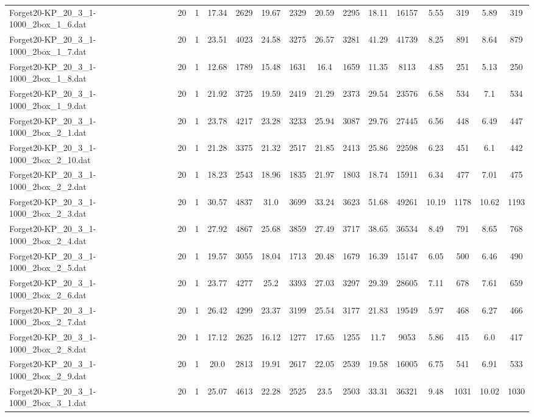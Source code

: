 \begin{table}[!ht]
{\begin{tabular}{lcccccccccccccc}
Forget20-KP\_20\_3\_1-1000\_2box\_1\_6.dat & 20 & 1 & 17.34 & 2629 & 19.67 & 2329 & 20.59 & 2295 & 18.11 & 16157 & 5.55 & 319 & 5.89 & 319 \\
Forget20-KP\_20\_3\_1-1000\_2box\_1\_7.dat & 20 & 1 & 23.51 & 4023 & 24.58 & 3275 & 26.57 & 3281 & 41.29 & 41739 & 8.25 & 891 & 8.64 & 879 \\
Forget20-KP\_20\_3\_1-1000\_2box\_1\_8.dat & 20 & 1 & 12.68 & 1789 & 15.48 & 1631 & 16.4 & 1659 & 11.35 & 8113 & 4.85 & 251 & 5.13 & 250 \\
Forget20-KP\_20\_3\_1-1000\_2box\_1\_9.dat & 20 & 1 & 21.92 & 3725 & 19.59 & 2419 & 21.29 & 2373 & 29.54 & 23576 & 6.58 & 534 & 7.1 & 534 \\
Forget20-KP\_20\_3\_1-1000\_2box\_2\_1.dat & 20 & 1 & 23.78 & 4217 & 23.28 & 3233 & 25.94 & 3087 & 29.76 & 27445 & 6.56 & 448 & 6.49 & 447 \\
Forget20-KP\_20\_3\_1-1000\_2box\_2\_10.dat & 20 & 1 & 21.28 & 3375 & 21.32 & 2517 & 21.85 & 2413 & 25.86 & 22598 & 6.23 & 451 & 6.1 & 442 \\
Forget20-KP\_20\_3\_1-1000\_2box\_2\_2.dat & 20 & 1 & 18.23 & 2543 & 18.96 & 1835 & 21.97 & 1803 & 18.74 & 15911 & 6.34 & 477 & 7.01 & 475 \\
Forget20-KP\_20\_3\_1-1000\_2box\_2\_3.dat & 20 & 1 & 30.57 & 4837 & 31.0 & 3699 & 33.24 & 3623 & 51.68 & 49261 & 10.19 & 1178 & 10.62 & 1193 \\
Forget20-KP\_20\_3\_1-1000\_2box\_2\_4.dat & 20 & 1 & 27.92 & 4867 & 25.68 & 3859 & 27.49 & 3717 & 38.65 & 36534 & 8.49 & 791 & 8.65 & 768 \\
Forget20-KP\_20\_3\_1-1000\_2box\_2\_5.dat & 20 & 1 & 19.57 & 3055 & 18.04 & 1713 & 20.48 & 1679 & 16.39 & 15147 & 6.05 & 500 & 6.46 & 490 \\
Forget20-KP\_20\_3\_1-1000\_2box\_2\_6.dat & 20 & 1 & 23.77 & 4277 & 25.2 & 3393 & 27.03 & 3297 & 29.39 & 28605 & 7.11 & 678 & 7.61 & 659 \\
Forget20-KP\_20\_3\_1-1000\_2box\_2\_7.dat & 20 & 1 & 26.42 & 4299 & 23.37 & 3199 & 25.54 & 3177 & 21.83 & 19549 & 5.97 & 468 & 6.27 & 466 \\
Forget20-KP\_20\_3\_1-1000\_2box\_2\_8.dat & 20 & 1 & 17.12 & 2625 & 16.12 & 1277 & 17.65 & 1255 & 11.7 & 9053 & 5.86 & 415 & 6.0 & 417 \\
Forget20-KP\_20\_3\_1-1000\_2box\_2\_9.dat & 20 & 1 & 20.0 & 2813 & 19.91 & 2617 & 22.05 & 2539 & 19.58 & 16005 & 6.75 & 541 & 6.91 & 533 \\
Forget20-KP\_20\_3\_1-1000\_2box\_3\_1.dat & 20 & 1 & 25.07 & 4613 & 22.28 & 2525 & 23.5 & 2503 & 33.31 & 36321 & 9.48 & 1031 & 10.02 & 1030 \\

\end{tabular}}
\end{table}
